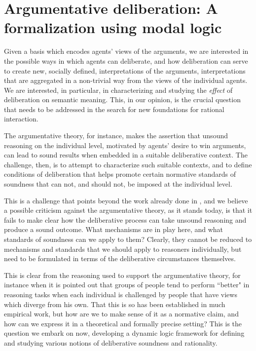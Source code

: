 \documentclass[greybox]{svmult}
\begin{document}
\section{Argumentative deliberation: A formalization using modal logic}\label{sec:ddl}

Given a basis which encodes agents' views of the arguments, we are interested in the possible ways in which agents can deliberate, and how deliberation can serve to create new, socially defined, interpretations of the arguments, interpretations that are aggregated in a non-trivial way from the views of the individual agents.  We are interested, in particular, in characterizing and studying the \emph{effect} of deliberation on semantic meaning. This, in our opinion, is the crucial question that needs to be addressed in the search for new foundations for rational interaction.

The argumentative theory, for instance, makes the assertion that unsound reasoning on the individual level, motivated by agents' desire to win arguments, can lead to sound results when embedded in a suitable deliberative context. The challenge, then, is to attempt to characterize such suitable contexts, and to define conditions of deliberation that helps promote certain normative standards of soundness that can not, and should not, be imposed at the individual level. 

This is a challenge that points beyond the work already done in \cite{whyreason}, and we believe a possible criticism against the argumentative theory, as it stands today, is that it fails to make clear how the deliberative process can take unsound reasoning and produce a sound outcome.  What mechanisms are in play here, and what standards of soundness can we apply to them? Clearly, they cannot be reduced to mechanisms and standards that we should apply to reasoners individually, but need to be formulated in terms of the deliberative circumstances themselves.

This is clear from the reasoning used to support the argumentative theory, for instance when it is pointed out that groups of people tend to perform ``better" in reasoning tasks when each individual is challenged by people that have views which diverge from his own. That this is so has been established in much empirical work, but how are we to make sense of it as a normative claim, and how can we express it in a theoretical and formally precise setting? This is the question we embark on now, developing a dynamic logic framework for defining and studying various notions of deliberative soundness and rationality.
\end{document}
